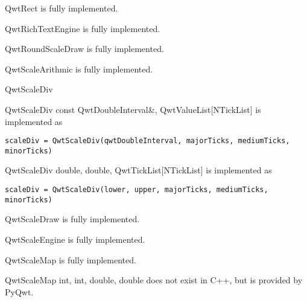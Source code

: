 \documentclass{manual}
\begin{document}
\begin{classdesc*}{QwtRect}
  is fully implemented.
\end{classdesc*}

\begin{classdesc*}{QwtRichTextEngine}
  is fully implemented.
\end{classdesc*}

\begin{classdesc*}{QwtRoundScaleDraw}
  is fully implemented.
\end{classdesc*}

\begin{classdesc*}{QwtScaleArithmic}
  is fully implemented.
\end{classdesc*}

\begin{classdesc*}{QwtScaleDiv}

  \begin{cfuncdesc}{}
    {QwtScaleDiv}{
      const QwtDoubleInterval\&,
      QwtValueList[NTickList]}
    is implemented as
    \begin{verbatim}
scaleDiv = QwtScaleDiv(qwtDoubleInterval, majorTicks, mediumTicks, minorTicks)
    \end{verbatim}
  \end{cfuncdesc}

  \begin{cfuncdesc}{}
    {QwtScaleDiv}{
      double,
      double,
      QwtTickList[NTickList]}
    is implemented as
    \begin{verbatim}
scaleDiv = QwtScaleDiv(lower, upper, majorTicks, mediumTicks, minorTicks)
    \end{verbatim}
  \end{cfuncdesc}

\end{classdesc*}

\begin{classdesc*}{QwtScaleDraw}
  is fully implemented.
\end{classdesc*}

\begin{classdesc*}{QwtScaleEngine}
  is fully implemented.
\end{classdesc*}

\begin{classdesc*}{QwtScaleMap}
  is fully implemented.

  \begin{cfuncdesc}{}
    {QwtScaleMap}{
      int,
      int,
      double,
      double}
    does not exist in C++, but is provided by PyQwt. 
  \end{cfuncdesc}
\end{classdesc*}
\end{document}
